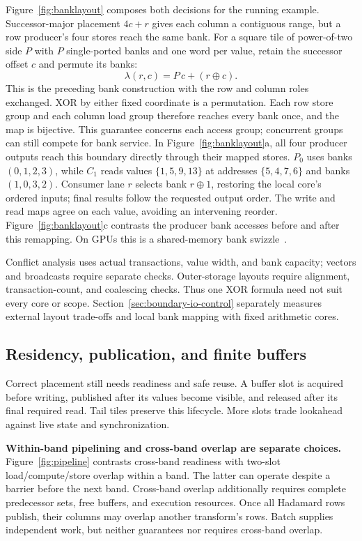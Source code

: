 Figure~\ref{fig:banklayout} composes both decisions for the running example.
Successor-major placement $4c+r$ gives each column a contiguous range, but a
row producer's four stores reach the same bank. For a square tile of
power-of-two side $P$ with $P$ single-ported banks and one word per value,
retain the successor offset $c$ and permute its banks:
\begin{equation}
\lambda(r,c)=P\,c+(r\mathbin{\oplus}c).
\label{eq:swizzle}
\end{equation}
This is the preceding bank construction with the row and column roles
exchanged. XOR by either fixed coordinate is a permutation. Each row store
group and each column load group therefore reaches every bank once, and the
map is bijective. This guarantee concerns each access group; concurrent
groups can still compete for bank service. In Figure~\ref{fig:banklayout}a,
all four producer outputs reach this boundary directly through their mapped
stores. $P_0$ uses banks $(0,1,2,3)$, while $C_1$ reads values $\{1,5,9,13\}$ at addresses $\{5,4,7,6\}$ and banks
$(1,0,3,2)$. Consumer lane $r$ selects bank $r\mathbin{\oplus}1$, restoring
the local core's ordered inputs; final results follow the requested output
order. The write and read maps agree on each value, avoiding an intervening
reorder. Figure~\ref{fig:banklayout}c contrasts the producer bank accesses
before and after this remapping. On GPUs this is a shared-memory bank
swizzle~\cite{cudaSwizzle}.

Conflict analysis uses actual transactions, value width, and bank capacity;
vectors and broadcasts require separate checks. Outer-storage layouts require
alignment, transaction-count, and coalescing checks. Thus one XOR formula
need not suit every core or scope.
Section~\ref{sec:boundary-io-control} separately measures external layout
trade-offs and local bank mapping with fixed arithmetic cores.

\subsection{Residency, publication, and finite buffers}
Correct placement still needs readiness and safe reuse. A buffer slot is
acquired before writing, published after its values become visible, and
released after its final required read. Tail tiles preserve this lifecycle.
More slots trade lookahead against live state and synchronization.

\textbf{Within-band pipelining and cross-band overlap are separate choices.}
Figure~\ref{fig:pipeline} contrasts cross-band readiness with two-slot
load/compute/store overlap within a band. The latter can operate despite a
barrier before the next band. Cross-band overlap additionally requires complete
predecessor sets, free buffers, and execution resources. Once all Hadamard rows
publish, their columns may overlap another transform's rows. Batch supplies
independent work, but neither guarantees nor requires cross-band overlap.

